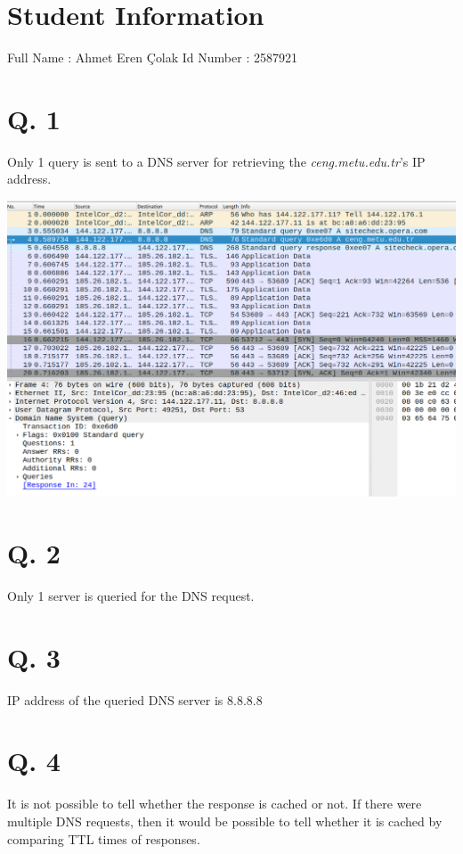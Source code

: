 \documentclass[11pt]{article}
\begin{document}
	\section*{Student Information } 
	Full Name :  Ahmet Eren {\c C}olak \newline
	Id Number :  2587921 

	\section*{Q. 1}
	Only 1 query is sent to a DNS server for retrieving the \emph{ceng.metu.edu.tr}'s IP address.
	
	\begin{center}
		\includegraphics[scale=0.25]{dnsquery}
	\end{center}

	\section*{Q. 2}
	Only 1 server is queried for the DNS request.
	
	\section*{Q. 3}
	IP address of the queried DNS server is 8.8.8.8
	
	\section*{Q. 4}
	It is not possible to tell whether the response is cached or not.
	If there were multiple DNS requests, then it would be possible to tell whether it is cached by comparing TTL times of responses.
\end{document}

